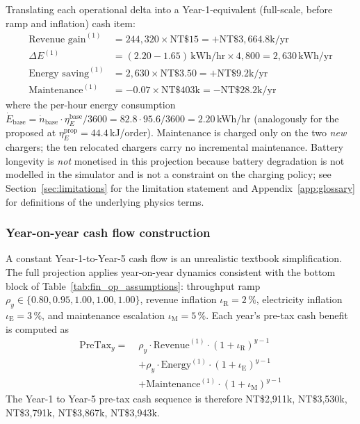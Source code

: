 \documentclass[conference]{IEEEtran}
\begin{document}
Translating each operational delta into a Year-1-equivalent (full-scale, before ramp and inflation) cash item:
\begin{align}
\text{Revenue gain}^{(1)} &= 244{,}320 \times \text{NT\$}15 = +\text{NT\$}3{,}664.8\text{k/yr} \\
\Delta E^{(1)} &= (2.20 - 1.65)\,\text{kWh/hr} \times 4{,}800 = 2{,}630\,\text{kWh/yr} \\
\text{Energy saving}^{(1)} &= 2{,}630 \times \text{NT\$}3.50 = +\text{NT\$}9.2\text{k/yr} \\
\text{Maintenance}^{(1)} &= -0.07 \times \text{NT\$}403\text{k} = -\text{NT\$}28.2\text{k/yr}
\end{align}
where the per-hour energy consumption $\dot{E}_\text{base} = \dot{n}_\text{base} \cdot \eta_E^\text{base} / 3600 = 82.8 \cdot 95.6/3600 = 2.20$\,kWh/hr (analogously for the proposed at $\eta_E^\text{prop} = 44.4$\,kJ/order). Maintenance is charged only on the two \emph{new} chargers; the ten relocated chargers carry no incremental maintenance. Battery longevity is \emph{not} monetised in this projection because battery degradation is not modelled in the simulator and is not a constraint on the charging policy; see Section~\ref{sec:limitations} for the limitation statement and Appendix~\ref{app:glossary} for definitions of the underlying physics terms.

\subsubsection{Year-on-year cash flow construction}

A constant Year-1-to-Year-5 cash flow is an unrealistic textbook simplification. The full projection applies year-on-year dynamics consistent with the bottom block of Table~\ref{tab:fin_op_assumptions}: throughput ramp $\rho_y \in \{0.80, 0.95, 1.00, 1.00, 1.00\}$, revenue inflation $\iota_\text{R} = 2\,\%$, electricity inflation $\iota_\text{E} = 3\,\%$, and maintenance escalation $\iota_\text{M} = 5\,\%$. Each year's pre-tax cash benefit is computed as
\begin{equation}
\begin{aligned}
\text{PreTax}_y = \;& \rho_y \cdot \text{Revenue}^{(1)} \cdot (1+\iota_\text{R})^{y-1} \\
&+ \rho_y \cdot \text{Energy}^{(1)} \cdot (1+\iota_\text{E})^{y-1} \\
&+ \text{Maintenance}^{(1)} \cdot (1+\iota_\text{M})^{y-1}
\end{aligned}
\label{eq:pretax_y}
\end{equation}
The Year-1 to Year-5 pre-tax cash sequence is therefore NT\$2{,}911k, NT\$3{,}530k, NT\$3{,}791k, NT\$3{,}867k, NT\$3{,}943k.
\end{document}
